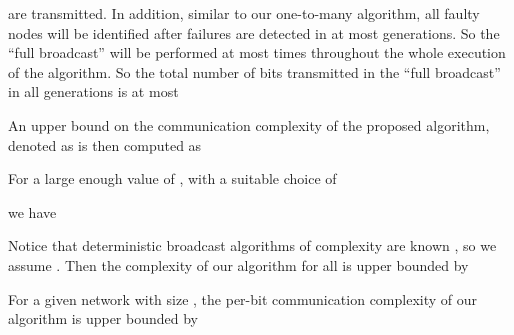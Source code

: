 \documentclass[12pt]{article}
\begin{document}
are transmitted. In addition, similar to our one-to-many algorithm, all faulty nodes will be identified after failures are detected in at most  generations. So the ``full broadcast'' will be performed at most  times throughout the whole execution of the algorithm. So the total number of bits transmitted in the ``full broadcast'' in all generations is at most 

An upper bound on the communication complexity of the proposed algorithm, denoted as  is then computed as

For a large enough value of , with a suitable choice of 

we have


Notice that deterministic broadcast algorithms of complexity  are known \cite{bit_optimal_89}, so we assume . Then the complexity of our algorithm for all  is upper bounded by


For a given network with size , the per-bit communication complexity of our algorithm is upper bounded by



 




\end{document}
